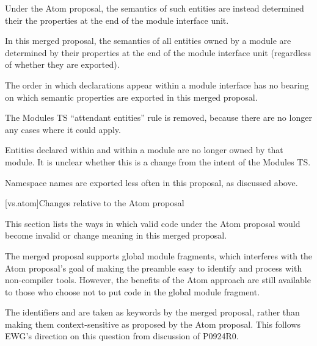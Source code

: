 Under the Atom proposal,
the semantics of such entities
are instead determined their the properties
at the end of the module interface unit.

In this merged proposal,
the semantics of all entities owned by a module
are determined by their properties
at the end of the module interface unit
(regardless of whether they are exported).
\begin{note}
The order in which declarations appear within a module interface
has no bearing on which semantic properties are exported
in this merged proposal.
\end{note}

The Modules TS ``attendant entities'' rule is removed,
because there are no longer any cases where it could apply.

\pnum
Entities declared within  and 
within a module are no longer owned by that module.
It is unclear whether this is a change from the intent of
the Modules TS.

\pnum
Namespace names are exported less often in this proposal, as discussed above.

[vs.atom]{Changes relative to the Atom proposal}

\pnum
This section lists the ways in which valid code under the Atom proposal
would become invalid or change meaning in this merged proposal.

\pnum
The merged proposal supports global module fragments,
which interferes with the Atom proposal's goal
of making the preamble easy to identify and process
with non-compiler tools.
However, the benefits of the Atom approach are still available
to those who choose not to put code in the global module fragment.

\pnum
The identifiers  and  are taken as keywords
by the merged proposal,
rather than making them context-sensitive as proposed by the Atom proposal.
This follows EWG's direction on this question from discussion of P0924R0.

